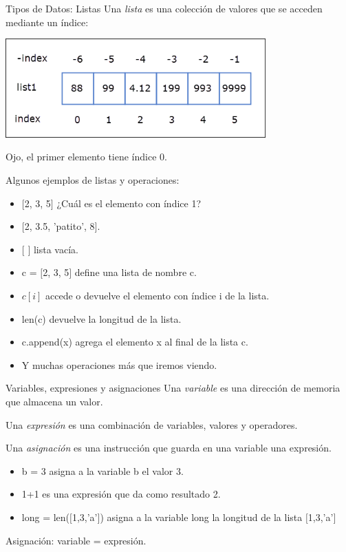 \documentclass{beamer}
\begin{document}
\begin{frame}{Tipos de Datos:  Listas}
Una \emph{lista} es una colección de valores que se acceden mediante un índice:


\includegraphics[width=10cm]{lista.png}

\alert{Ojo, el primer elemento tiene índice 0.}\pause

Algunos ejemplos de listas y operaciones:
\begin{itemize}
	\item $[$2, 3, 5$]$ \pause ¿Cuál es el elemento con índice 1?\pause
	\item $[$2, 3.5, 'patito', 8$]$.\pause
	\item $[$ $]$ lista vacía.\pause
	\item c = $[$2, 3, 5$]$ define una lista de nombre c.
	\item $c[i]$ accede o devuelve el elemento con índice i de la lista.\pause
	\item len(c) devuelve la longitud de la lista.\pause
	\item c.append(x) agrega el elemento x al final de la lista c.
	\item Y muchas operaciones más que iremos viendo.
\end{itemize}
\end{frame}


\begin{frame}{Variables, expresiones y asignaciones}
Una \emph{variable} es una dirección de memoria que almacena un valor.\pause

Una \emph{expresión} es una combinación de variables, valores y operadores.\pause

Una \emph{asignación} es una instrucción que guarda en una variable una expresión.\pause

\begin{itemize}
	\item b = 3 asigna a la variable b el valor 3.\pause
	\item 1+1 es una expresión que da como resultado 2.\pause
	\item long = len($[$1,3,'a'$]$) asigna a la variable long la longitud de la lista $[$1,3,'a'$]$
\end{itemize}

\alert{Asignación: variable = expresión}.
\end{frame}
\end{document}
